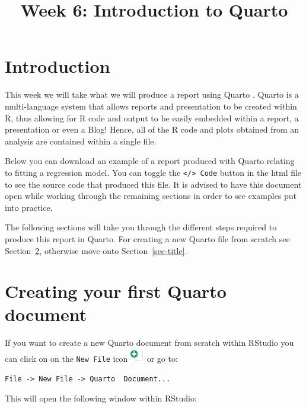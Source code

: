 \documentclass[
  letterpaper,
  DIV=11,
  numbers=noendperiod]{scrartcl}
\title{Week 6: Introduction to Quarto}
\author{}
\date{}
\makeatletter
\renewcommand{\maketitle}{\bgroup\setlength{\parindent}{0pt}
\begin{flushleft}
  {\color{uniblue}\sffamily\huge\textbf{\@title}} \vspace{0.3cm} \newline
  {\Large {\@subtitle}} \newline
  \@author
\end{flushleft}\egroup
}
\renewcommand*\contentsname{Table of contents}
\newcommand\contentsname{Table of contents}
\makeatother
\begin{document}
\maketitle

\pagestyle{mystyle}

\renewcommand*\contentsname{Contents}
{
\hypersetup{linkcolor=}
\setcounter{tocdepth}{3}
\tableofcontents
}
\section{Introduction}\label{introduction}

This week we will take what we will produce a report using Quarto .
Quarto is a multi-language system that allows reports and presentation
to be created within R, thus allowing for R code and output to be easily
embedded within a report, a presentation or even a Blog! Hence, all of
the R code and plots obtained from an analysis are contained within a
single file.

Below you can download an example of a report produced with Quarto
relating to fitting a regression model. You can toggle the
\texttt{\textless{}/\textgreater{}\ Code} button in the html file to see
the source code that produced this file. It is advised to have this
document open while working through the remaining sections in order to
see examples put into practice.

The following sections will take you through the different steps
required to produce this report in Quarto. For creating a new Quarto
file from scratch see Section~\ref{sec-quarto_init}, otherwise move onto
Section~\ref{sec-title}.

\section{Creating your first Quarto document}\label{sec-quarto_init}

If you want to create a new Quarto document from scratch within RStudio
you can click on on the \texttt{New\ File} icon
\includegraphics[width=0.23958in,height=\textheight]{images/new_doc.png}
or go to:

\texttt{File\ -\textgreater{}\ New\ File\ -\textgreater{}\ Quarto\ \ Document...}

This will open the following window within RStudio:
\end{document}
